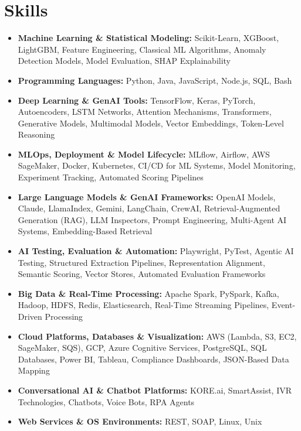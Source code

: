 \documentclass[letterpaper,11pt]{article}
\begin{document}
\section{Skills}
\vspace{-4pt}
\begin{itemize}[leftmargin=0in, label={}, itemsep=1pt, topsep=2pt, parsep=0pt]
    \item \small{\textbf{Machine Learning \& Statistical Modeling:} Scikit-Learn, XGBoost, LightGBM, Feature Engineering, Classical ML Algorithms, Anomaly Detection Models, Model Evaluation, SHAP Explainability}
    \item \small{\textbf{Programming Languages:} Python, Java, JavaScript, Node.js, SQL, Bash}
    \item \small{\textbf{Deep Learning \& GenAI Tools:} TensorFlow, Keras, PyTorch, Autoencoders, LSTM Networks, Attention Mechanisms, Transformers, Generative Models, Multimodal Models, Vector Embeddings, Token-Level Reasoning}
    \item \small{\textbf{MLOps, Deployment \& Model Lifecycle:} MLflow, Airflow, AWS SageMaker, Docker, Kubernetes, CI/CD for ML Systems, Model Monitoring, Experiment Tracking, Automated Scoring Pipelines}
    \item \small{\textbf{Large Language Models \& GenAI Frameworks:} OpenAI Models, Claude, LlamaIndex, Gemini, LangChain, CrewAI, Retrieval-Augmented Generation (RAG), LLM Inspectors, Prompt Engineering, Multi-Agent AI Systems, Embedding-Based Retrieval}
    \item \small{\textbf{AI Testing, Evaluation \& Automation:} Playwright, PyTest, Agentic AI Testing, Structured Extraction Pipelines, Representation Alignment, Semantic Scoring, Vector Stores, Automated Evaluation Frameworks}
    \item \small{\textbf{Big Data \& Real-Time Processing:} Apache Spark, PySpark, Kafka, Hadoop, HDFS, Redis, Elasticsearch, Real-Time Streaming Pipelines, Event-Driven Processing}
    \item \small{\textbf{Cloud Platforms, Databases \& Visualization:} AWS (Lambda, S3, EC2, SageMaker, SQS), GCP, Azure Cognitive Services, PostgreSQL, SQL Databases, Power BI, Tableau, Compliance Dashboards, JSON-Based Data Mapping}
    \item \small{\textbf{Conversational AI \& Chatbot Platforms:} KORE.ai, SmartAssist, IVR Technologies, Chatbots, Voice Bots, RPA Agents}
    \item \small{\textbf{Web Services \& OS Environments:} REST, SOAP, Linux, Unix}
\end{itemize}
\end{document}
